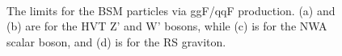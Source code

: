 \begin{figure}[ht]
	\centering
	\\
	\caption{The limits for the BSM particles via ggF/qqF production. (a) and (b) are for the HVT Z' and W' bosons, while (c) is for the NWA scalar boson, and (d) is for the RS graviton.}
	\label{Fig:limit_ggF}
\end{figure}

